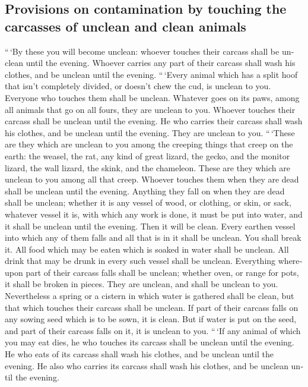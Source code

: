 \begin{paracol}{2}
\begin{otherlanguage}{english}
{\subsection{Provisions on contamination by touching the carcasses of
unclean and clean
animals}\label{provisions-on-contamination-by-touching-the-carcasses-of-unclean-and-clean-animals}}

 ``\,`By these you will become unclean: whoever touches
their carcass shall be unclean until the evening. 
Whoever carries any part of their carcass shall wash his clothes, and be
unclean until the evening.  ``\,`Every animal which has a
split hoof that isn't completely divided, or doesn't chew the cud, is
unclean to you. Everyone who touches them shall be unclean.
 Whatever goes on its paws, among all animals that go on
all fours, they are unclean to you. Whoever touches their carcass shall
be unclean until the evening.  He who carries their
carcass shall wash his clothes, and be unclean until the evening. They
are unclean to you.  ``\,`These are they which are
unclean to you among the creeping things that creep on the earth: the
weasel, the rat, any kind of great lizard,  the gecko,
and the monitor lizard, the wall lizard, the skink, and the chameleon.
 These are they which are unclean to you among all that
creep. Whoever touches them when they are dead shall be unclean until
the evening.  Anything they fall on when they are dead
shall be unclean; whether it is any vessel of wood, or clothing, or
skin, or sack, whatever vessel it is, with which any work is done, it
must be put into water, and it shall be unclean until the evening. Then
it will be clean.  Every earthen vessel into which any of
them falls and all that is in it shall be unclean. You shall break it.
 All food which may be eaten which is soaked in water
shall be unclean. All drink that may be drunk in every such vessel shall
be unclean.  Everything whereupon part of their carcass
falls shall be unclean; whether oven, or range for pots, it shall be
broken in pieces. They are unclean, and shall be unclean to you.
 Nevertheless a spring or a cistern in which water is
gathered shall be clean, but that which touches their carcass shall be
unclean.  If part of their carcass falls on any sowing
seed which is to be sown, it is clean.  But if water is
put on the seed, and part of their carcass falls on it, it is unclean to
you.  ``\,`If any animal of which you may eat dies, he
who touches its carcass shall be unclean until the evening.
 He who eats of its carcass shall wash his clothes, and
be unclean until the evening. He also who carries its carcass shall wash
his clothes, and be unclean until the evening.


\end{otherlanguage}
\end{paracol}

